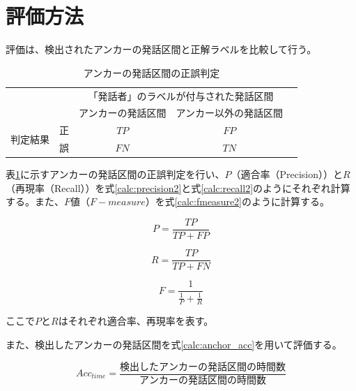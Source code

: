 \section{評価方法}
評価は、検出されたアンカーの発話区間と正解ラベルを比較して行う。

\begin{table}[H]
\begin{center}
    \caption{アンカーの発話区間の正誤判定 \label{table:clustering}}
\begin{tabular}{|c|c|c|c|l}
\cline{1-4}
\multicolumn{2}{|c|}{\multirow{2}{*}{}} & \multicolumn{2}{c|}{「発話者」のラベルが付与された発話区間} &  \\ \cline{3-4}
\multicolumn{2}{|c|}{}                  & アンカーの発話区間        & アンカー以外の発話区間        &  \\ \cline{1-4}
\multirow{2}{*}{判定結果}        & 正        & $TP$                  & $FP$                   &  \\ \cline{2-4}
& 誤        & $FN$                  & $TN$                   &  \\ \cline{1-4}
\end{tabular}
\end{center}
\end{table}

表\ref{table:clustering}に示すアンカーの発話区間の正誤判定を行い、$P$（適合率（Precision））と$R$（再現率（Recall））を式\ref{calc:precision2}と式\ref{calc:recall2}のようにそれぞれ計算する。また、$F$値（$F-measure$）を式\ref{calc:fmeasure2}のように計算する。

\begin{equation}
\label{calc:precision2}
P = \frac{TP}{TP + FP}
\end{equation}

\begin{equation}
\label{calc:recall2}
R = \frac{TP}{TP + FN}
\end{equation}

\begin{equation}
\label{calc:fmeasure2}
F = \frac{1}{\frac{1}{P} + \frac{1}{R}}
\end{equation}

ここで$P$と$R$はそれぞれ適合率、再現率を表す。

また、検出したアンカーの発話区間を式\ref{calc:anchor_acc}を用いて評価する。

\begin{equation}
\label{calc:anchor_acc}
Acc_{time} = \frac{検出したアンカーの発話区間の時間数}{アンカーの発話区間の時間数}
\end{equation}

